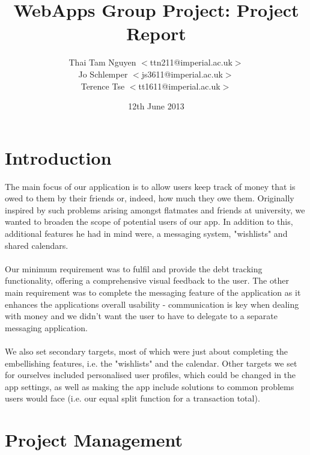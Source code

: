 \documentclass[a4paper,11pt]{article}
\begin{document}
\title{WebApps Group Project: Project Report} \date{12th June
  2013} \author{
  Thai Tam Nguyen $<$ttn211@imperial.ac.uk$>$\\
  Jo Schlemper $<$js3611@imperial.ac.uk$>$\\
  Terence Tse  $<$tt1611@imperial.ac.uk$>$ }
\maketitle

\section*{Introduction }

     The main focus of our application is to allow users  keep track of money that is owed to them by their friends or, indeed, how much they owe them. Originally inspired by such problems arising amongst flatmates and friends at university, we wanted to broaden the scope of potential users of our app. In addition to this, additional features he had in mind were, a messaging system, "wishlists" and shared calendars.
\\
\\     Our minimum requirement was to fulfil and provide the debt tracking functionality, offering a comprehensive visual feedback to the user. The other main requirement was to complete the messaging feature of the application as it enhances the applications overall usability - communication is key when dealing with money and we didn't want the user to have to delegate to a separate messaging application.
\\
\\     We also set secondary targets, most of which were just about completing the embellishing features, i.e. the "wishlists" and the calendar. Other targets we set for ourselves included personalised user profiles, which could be changed in the app settings, as well as making the app include solutions to common problems users would face (i.e. our equal split function for a transaction total). 



\section*{Project Management}
\end{document}
